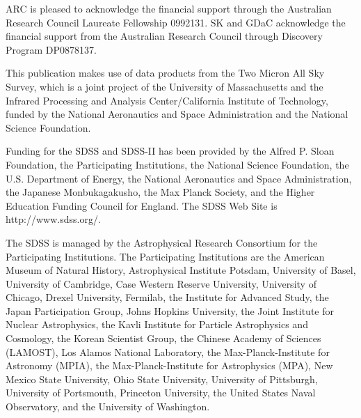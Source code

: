 \documentclass{emulateapj}
\begin{document}
ARC is pleased to acknowledge the financial support through the Australian Research Council Laureate Fellowship 0992131.  SK and GDaC acknowledge the financial support from the Australian Research Council through Discovery Program DP0878137.

This publication makes use of data products from the Two Micron All Sky Survey, which is a joint project of the University of Massachusetts and the Infrared Processing and Analysis Center/California Institute of Technology, funded by the National Aeronautics and Space Administration and the National Science Foundation.

Funding for the SDSS and SDSS-II has been provided by the Alfred P. Sloan Foundation, the Participating Institutions, the National Science Foundation, the U.S. Department of Energy, the National Aeronautics and Space Administration, the Japanese Monbukagakusho, the Max Planck Society, and the Higher Education Funding Council for England. The SDSS Web Site is http://www.sdss.org/.

The SDSS is managed by the Astrophysical Research Consortium for the Participating Institutions. The Participating Institutions are the American Museum of Natural History, Astrophysical Institute Potsdam, University of Basel, University of Cambridge, Case Western Reserve University, University of Chicago, Drexel University, Fermilab, the Institute for Advanced Study, the Japan Participation Group, Johns Hopkins University, the Joint Institute for Nuclear Astrophysics, the Kavli Institute for Particle Astrophysics and Cosmology, the Korean Scientist Group, the Chinese Academy of Sciences (LAMOST), Los Alamos National Laboratory, the Max-Planck-Institute for Astronomy (MPIA), the Max-Planck-Institute for Astrophysics (MPA), New Mexico State University, Ohio State University, University of Pittsburgh, University of Portsmouth, Princeton University, the United States Naval Observatory, and the University of Washington.



\end{document}
